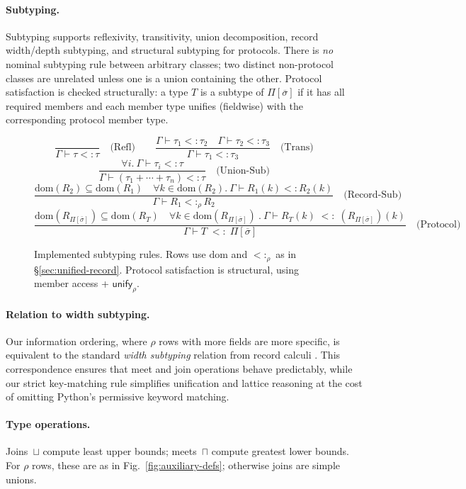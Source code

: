 \paragraph{Subtyping.}  
Subtyping supports reflexivity, transitivity, union decomposition, record width/depth subtyping, and structural subtyping for protocols.  
There is \emph{no} nominal subtyping rule between arbitrary classes; two distinct non-protocol classes are unrelated unless one is a union containing the other.  
Protocol satisfaction is checked structurally: a type $T$ is a subtype of $\Pi[\overline{\sigma}]$ if it has all required members and each member type unifies (fieldwise) with the corresponding protocol member type.

\begin{figure*}[t]
\centering
\[
\frac{}{\Gamma \vdash \tau <: \tau} \quad \text{(Refl)}
\qquad
\frac{\Gamma \vdash \tau_1 <: \tau_2 \quad \Gamma \vdash \tau_2 <: \tau_3}{\Gamma \vdash \tau_1 <: \tau_3} \quad \text{(Trans)}
\]
\[
\frac{\forall i.\ \Gamma \vdash \tau_i <: \tau}{\Gamma \vdash (\tau_1 + \cdots + \tau_n) <: \tau} \quad \text{(Union-Sub)}
\]
\[
\frac{\mathrm{dom}(R_2) \subseteq \mathrm{dom}(R_1) \quad \forall k \in \mathrm{dom}(R_2).\ \Gamma \vdash R_1(k) <: R_2(k)}
     {\Gamma \vdash R_1 <:_\rho R_2} \quad \text{(Record-Sub)}
\]
\[
\frac{\mathrm{dom}(R_{\Pi[\overline{\sigma}]}) \subseteq \mathrm{dom}(R_T)
      \quad \forall k \in \mathrm{dom}(R_{\Pi[\overline{\sigma}]})\ .\ \Gamma \vdash R_T(k) \;<:\; (R_{\Pi[\overline{\sigma}]}\!)(k)}
     {\Gamma \vdash T \;<:\; \Pi[\overline{\sigma}]} \quad \text{(Protocol)}
\]
\caption{Implemented subtyping rules. Rows use $\mathrm{dom}$ and $<:_\rho$ as in \S\ref{sec:unified-record}. Protocol satisfaction is structural, using member access + $\mathsf{unify}_{\rho}$.}
\label{fig:subtyping}
\end{figure*}

\paragraph{Relation to width subtyping.}
Our information ordering, where $\rho$ rows with more fields are more specific, is
equivalent to the standard \emph{width subtyping} relation from record calculi
\cite{cardelli1992extensible}. This correspondence ensures that meet and join operations
behave predictably, while our strict key-matching rule simplifies unification and
lattice reasoning at the cost of omitting Python’s permissive keyword matching.

\paragraph{Type operations.}  
Joins~$\sqcup$ compute least upper bounds; meets~$\sqcap$ compute greatest lower bounds.  
For $\rho$ rows, these are as in Fig.~\ref{fig:auxiliary-defs}; otherwise joins are simple unions.

